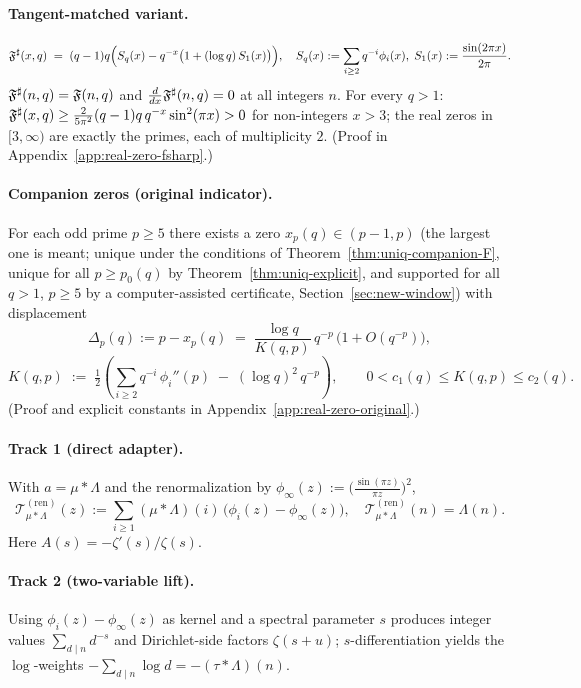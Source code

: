 \paragraph{Tangent-matched variant.}
\[
\mathfrak F^{\sharp}(x,q)\;=\;(q-1)q\Big(S_q(x)-q^{-x}\bigl(1+(\log q)\,S_1(x)\bigr)\Big),
\quad
S_q(x):=\sum_{i\ge2} q^{-i}\phi_i(x),\;
S_1(x):=\frac{\sin(2\pi x)}{2\pi}.
\]
\(\mathfrak F^{\sharp}(n,q)=\mathfrak F(n,q)\) and \(\frac{d}{dx}\mathfrak F^{\sharp}(n,q)=0\) at all integers \(n\).
For every \(q>1\): \(\mathfrak F^{\sharp}(x,q)\ge\frac{2}{5\pi^2}(q-1)q\,q^{-x}\sin^2(\pi x)>0\) for non-integers \(x>3\); the real zeros in \([3,\infty)\) are exactly the primes, each of multiplicity \(2\).
(Proof in Appendix~\ref{app:real-zero-fsharp}.)

\paragraph{Companion zeros (original indicator).}
For each odd prime \(p\ge5\) there exists a zero \(x_p(q)\in(p-1,p)\) (the largest one is meant; unique under the conditions of Theorem~\ref{thm:uniq-companion-F}, unique for all $p\ge p_0(q)$ by Theorem~\ref{thm:uniq-explicit}, and supported for all $q>1$, $p\ge5$ by a computer-assisted certificate, Section~\ref{sec:new-window}) with displacement
\[
\Delta_p(q):=p-x_p(q)\;=\;\frac{\log q}{K(q,p)}\,q^{-p}\,\bigl(1+O(q^{-p})\bigr),
\]
\[
K(q,p)\;:=\;\tfrac12\!\left(\sum_{i\ge2} q^{-i}\,\phi_i''(p)\;-\;(\log q)^2\,q^{-p}\right),
\qquad
0<c_1(q)\le K(q,p)\le c_2(q).
\]
(Proof and explicit constants in Appendix~\ref{app:real-zero-original}.)

\paragraph{Track 1 (direct adapter).}
With \(a=\mu*\Lambda\) and the renormalization by \(\phi_\infty(z):=\bigl(\tfrac{\sin(\pi z)}{\pi z}\bigr)^2\),
\[
\mathcal T^{(\mathrm{ren})}_{\mu*\Lambda}(z):=\sum_{i\ge1}(\mu*\Lambda)(i)\,\bigl(\phi_i(z)-\phi_\infty(z)\bigr),
\quad
\mathcal T^{(\mathrm{ren})}_{\mu*\Lambda}(n)=\Lambda(n).
\]
Here \(A(s)=-\zeta'(s)/\zeta(s)\).

\paragraph{Track 2 (two-variable lift).}
Using \(\phi_i(z)-\phi_\infty(z)\) as kernel and a spectral parameter \(s\) produces integer values
\(\sum_{d\mid n} d^{-s}\) and Dirichlet-side factors \(\zeta(s+u)\);
\(s\)-differentiation yields the \(\log\)-weights \(-\sum_{d\mid n}\log d=-(\tau*\Lambda)(n)\).

